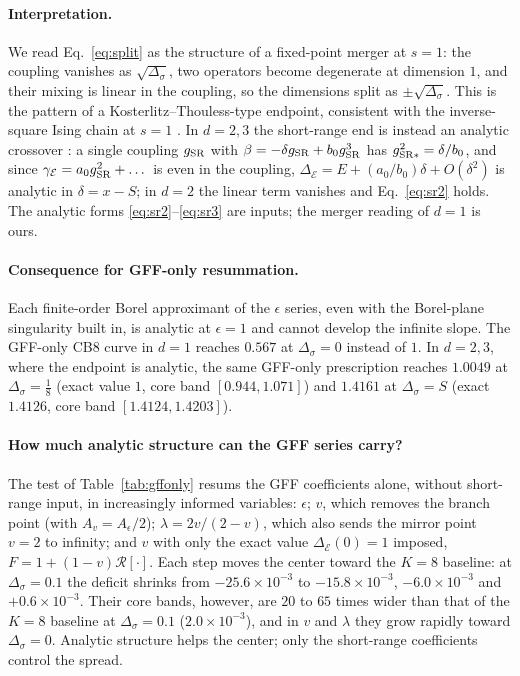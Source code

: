 \documentclass[11pt,a4paper]{article}
\numberwithin{equation}{section}
\newcommand{\De}{\Delta_{\mathcal E}}   %
\newcommand{\Ds}{\Delta_\sigma}
\newcommand{\Ae}{A_\epsilon}
\newcommand{\cR}{\mathcal R}
\newcommand{\sci}[2]{#1\times10^{#2}}
\begin{document}
\paragraph{Interpretation.} We read Eq.~\eqref{eq:split} as the structure of a
fixed-point merger at $s=1$: the coupling vanishes as $\sqrt{\Ds}$, two operators become
degenerate at dimension $1$, and their mixing is linear in the coupling, so the
dimensions split as $\pm\sqrt{\Ds}$. This is the pattern of a Kosterlitz--Thouless-type
endpoint, consistent with the inverse-square Ising chain at $s=1$ \cite{Kosterlitz:1976zz}.
In $d=2,3$ the short-range end is instead an analytic crossover \cite{Behan:2017emf}: a
single coupling $g_{\rm SR}$ with $\beta=-\delta g_{\rm SR}+b_0g_{\rm SR}^3$ has
$g_{\rm SR*}^2=\delta/b_0$, and since $\gamma_{\mathcal E}=a_0g_{\rm SR}^2+\dots$ is even in the
coupling, $\De=E+(a_0/b_0)\delta+O(\delta^2)$ is analytic in $\delta=x-S$; in $d=2$ the
linear term vanishes and Eq.~\eqref{eq:sr2} holds. The analytic forms
\eqref{eq:sr2}--\eqref{eq:sr3} are inputs; the merger reading of $d=1$ is ours.

\paragraph{Consequence for GFF-only resummation.} Each finite-order Borel approximant of the
$\epsilon$ series, even with the Borel-plane singularity built in, is analytic at
$\epsilon=1$ and cannot develop the infinite slope. The GFF-only CB8 curve in $d=1$ reaches $0.567$ at $\Ds=0$
instead of $1$. In $d=2,3$, where the endpoint is analytic, the same GFF-only
prescription reaches $1.0049$ at $\Ds=\frac18$ (exact value $1$, core band
$[0.944,1.071]$) and $1.4161$ at $\Ds=S$ (exact $1.4126$, core band $[1.4124,1.4203]$).

\paragraph{How much analytic structure can the GFF series carry?} The test of
Table~\ref{tab:gffonly} resums the GFF coefficients alone, without short-range input,
in increasingly informed variables: $\epsilon$; $v$, which removes the branch point (with
$A_v=\Ae/2$); $\lambda=2v/(2-v)$, which also sends the mirror point $v=2$ to infinity; and
$v$ with only the exact value $\De(0)=1$ imposed, $F=1+(1-v)\cR[\cdot]$. Each step moves
the center toward the $K=8$ baseline: at $\Ds=0.1$ the deficit shrinks from
$\sci{-25.6}{-3}$ to $\sci{-15.8}{-3}$, $\sci{-6.0}{-3}$ and $\sci{+0.6}{-3}$. Their core
bands, however, are $20$ to $65$ times wider than that of the $K=8$ baseline at $\Ds=0.1$
($\sci{2.0}{-3}$), and in $v$ and $\lambda$ they grow rapidly toward $\Ds=0$. Analytic
structure helps the center; only the short-range coefficients control the spread.
\end{document}
